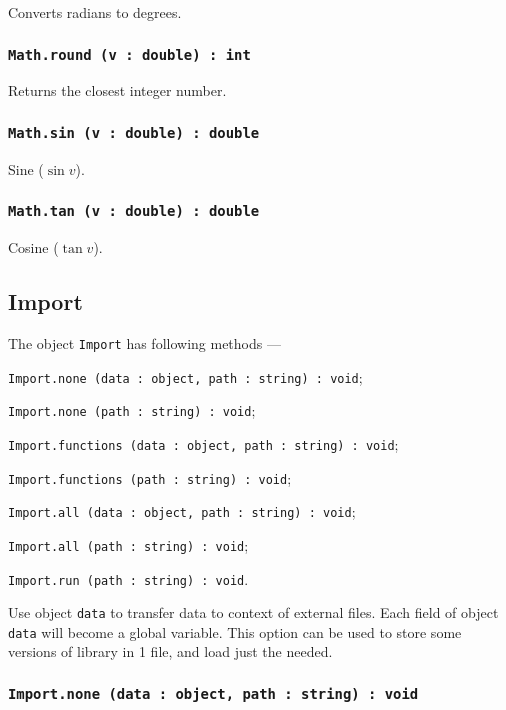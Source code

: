 Converts radians to degrees.

\subsubsection{\texttt{Math.round (v : double) : int}}

Returns the closest integer number.

\subsubsection{\texttt{Math.sin (v : double) : double}}

Sine ($\sin{v}$).

\subsubsection{\texttt{Math.tan (v : double) : double}}

Cosine ($\tan{v}$).

\subsection{{\color{orange} Import}}

The object \texttt{Import} has following methods —
\begin{icItems}
	\item \texttt{Import.none (data : object, path : string) : void};
	\item \texttt{Import.none (path : string) : void};
	\item \texttt{Import.functions (data : object, path : string) : void};
	\item \texttt{Import.functions (path : string) : void};
	\item \texttt{Import.all (data : object, path : string) : void};
	\item \texttt{Import.all (path : string) : void};
	\item \texttt{Import.run (path : string) : void}.
\end{icItems}

Use object \texttt{data} to transfer data to context of external files. Each field of object \texttt{data} will become a global variable. This option can be used to store some versions of library in 1 file, and load just the needed.

\subsubsection{\texttt{Import.none (data : object, path : string) : void}}

